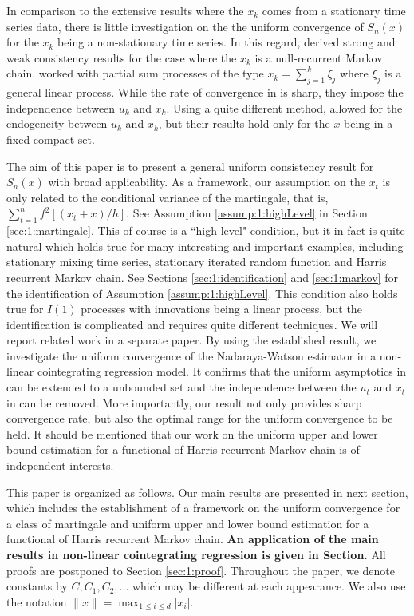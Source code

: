 In comparison to the extensive results where the  $x_k$ comes from a stationary time series data, there is little investigation on the the uniform convergence of $S_n(x)$ for the $x_k$ being a non-stationary time series. In this regard, \cite{gaolitjostheim2011} derived strong and weak consistency results for the case where the $x_k$ is a null-recurrent Markov chain. \cite{wangwang2012} worked  with partial sum processes of the type $x_k=\sum_{j=1}^k\xi_j$ where $\xi_j$ is a general linear process. While the rate of convergence   in \cite{gaolitjostheim2011} is sharp,  they impose the independence between $u_k$ and $x_k$. Using a quite different method, \cite{wangwang2012} allowed for the endogeneity between $u_k$ and $x_k$, but their results hold  only for the $x$ being in a fixed compact set.

The aim of this paper is to present a general uniform consistency  result for $S_n(x)$ with broad applicability. As a framework,  our  assumption on the $x_t$ is only related to the conditional variance of the  martingale, that is, $ \sum_{t=1}^n f^2[(x_t+x)/h]$. See Assumption \ref{assump:1:highLevel} in Section \ref{sec:1:martingale}.
This of course is a ``high level" condition, but it in fact is quite natural which holds true for many interesting and important examples, including stationary mixing time series, stationary  iterated random function and Harris  recurrent Markov chain. See Sections \ref{sec:1:identification} and \ref{sec:1:markov} for the identification of Assumption \ref{assump:1:highLevel}. This condition also holds true for $I(1)$ processes with innovations being a linear process, but the identification is complicated and requires quite different techniques. We will report related work in a separate paper.
By using the established result, we investigate the uniform convergence of the Nadaraya-Watson estimator in a non-linear cointegrating regression model. It confirms that the uniform asymptotics in \cite{wangwang2012} can be extended to a unbounded set and the independence between the $u_t$ and $x_t$ in \cite{gaolitjostheim2011} can be removed.
More importantly, our result not only  provides sharp convergence rate, but also the optimal range for the uniform convergence to be held. It should be mentioned that our work on the uniform upper and lower  bound estimation for a functional of Harris recurrent Markov chain is of independent interests.


This paper is organized as follows. Our main results are presented in next section, which includes the establishment of a framework on the uniform convergence for a class of martingale and uniform upper and lower  bound estimation for a functional of Harris recurrent Markov chain. {\bf \color{red} An application of the main results in non-linear cointegrating regression is given in Section.} All proofs are postponed to Section \ref{sec:1:proof}. Throughout the paper, we denote constants by $C, C_1, C_2,...$ which may be different at each appearance. We also use the notation $\|x\|=\max_{1\le i\le d}|x_i|$.




